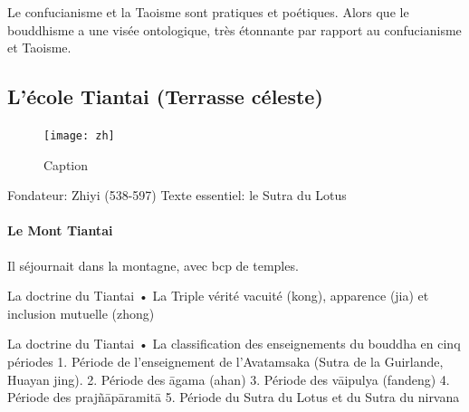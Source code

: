 \begin{Synthesis}
    Le confucianisme et la Taoisme sont pratiques et poétiques. Alors que le bouddhisme a une visée ontologique, très étonnante par rapport au confucianisme et Taoisme.
\end{Synthesis}

\subsection{L’école Tiantai (Terrasse céleste)}

\begin{figure}
    \centering
    \texttt{[image: zh]}
    \caption{Caption}
    \label{fig:enter-label}
\end{figure}



Fondateur: Zhiyi (538-597)
Texte essentiel: le Sutra du Lotus
 
\paragraph{Le Mont Tiantai}
Il séjournait dans la montagne, avec bcp de temples.


 
La doctrine du Tiantai
•	La Triple vérité
vacuité (kong), apparence (jia) et inclusion mutuelle (zhong)
 
La doctrine du Tiantai
•	La classification des enseignements du bouddha en cinq périodes
1.	Période de l’enseignement de l’Avatamsaka (Sutra de la Guirlande, Huayan jing).
2.	Période des āgama (ahan)
3.	Période des vāipulya (fandeng)
4.	Période des prajñāpāramitā
5.	Période du Sutra du Lotus et du Sutra du nirvana
